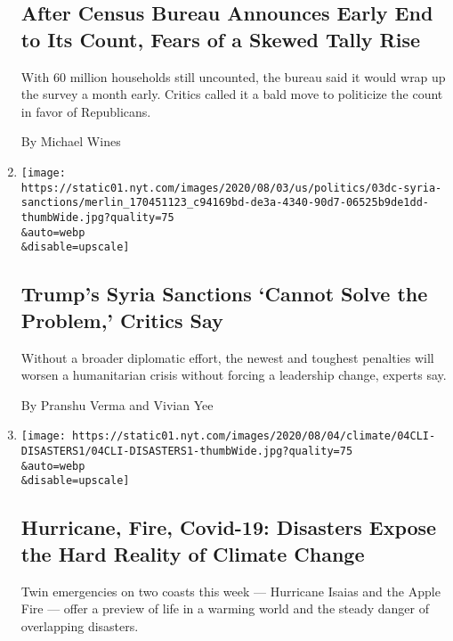 \begin{enumerate}
{  \subsection{After Census Bureau Announces Early End to Its Count,
  Fears of a Skewed Tally
  Rise}\label{after-census-bureau-announces-early-end-to-its-count-fears-of-a-skewed-tally-rise}}

  With 60 million households still uncounted, the bureau said it would
  wrap up the survey a month early. Critics called it a bald move to
  politicize the count in favor of Republicans.

  By Michael Wines
\item
  \href{/2020/08/04/world/middleeast/trump-assad-syria-sanctions.html}{}

  \texttt{[image: https://static01.nyt.com/images/2020/08/03/us/politics/03dc-syria-sanctions/merlin\_170451123\_c94169bd-de3a-4340-90d7-06525b9de1dd-thumbWide.jpg?quality=75\\\&auto=webp\\\&disable=upscale]}

  \hypertarget{trumps-syria-sanctions-cannot-solve-the-problem-critics-say}{%
  \subsection{Trump's Syria Sanctions `Cannot Solve the Problem,'
  Critics
  Say}\label{trumps-syria-sanctions-cannot-solve-the-problem-critics-say}}

  Without a broader diplomatic effort, the newest and toughest penalties
  will worsen a humanitarian crisis without forcing a leadership change,
  experts say.

  By Pranshu Verma and Vivian Yee
\item
  \href{/2020/08/04/climate/hurricane-isaias-apple-fire-climate.html}{}

  \texttt{[image: https://static01.nyt.com/images/2020/08/04/climate/04CLI-DISASTERS1/04CLI-DISASTERS1-thumbWide.jpg?quality=75\\\&auto=webp\\\&disable=upscale]}

  \hypertarget{hurricane-fire-covid-19-disasters-expose-the-hard-reality-of-climate-change}{%
  \subsection{Hurricane, Fire, Covid-19: Disasters Expose the Hard
  Reality of Climate
  Change}\label{hurricane-fire-covid-19-disasters-expose-the-hard-reality-of-climate-change}}

  Twin emergencies on two coasts this week --- Hurricane Isaias and the
  Apple Fire --- offer a preview of life in a warming world and the
  steady danger of overlapping disasters.


\end{enumerate}

